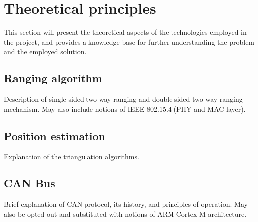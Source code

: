 \section{Theoretical principles}
This section will present the theoretical aspects of the technologies employed in the project, and provides a knowledge base for further understanding the problem and the employed solution.


\subsection{Ranging algorithm}
Description of single-sided two-way ranging and double-sided two-way ranging mechanism.
May also include notions of IEEE 802.15.4 (PHY and MAC layer).

\subsection{Position estimation}
Explanation of the triangulation algorithms.

\subsection{CAN Bus}
Brief explanation of CAN protocol, its history, and principles of operation.
May also be opted out and substituted with notions of ARM Cortex-M architecture.
